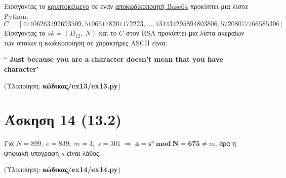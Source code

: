 \documentclass[12pt]{article}
\newcommand{\lt}{\latintext}
\begin{document}
\noindent
Εισάγοντας το \href{https://github.com/drazioti/book_crypto/blob/master/public_key_crypto/7.2}{κρυπτοκείμενο} σε έναν \href{https://www.base64decode.org/}{αποκωδικοποιητή {\lt Base64}} προκύπτει 
μια λίστα {\lt Python}:
\[
C=[47406263192693509,51065178201172223, ..., 134434295894803806,57208077766585306]
\]
Είσάγοντας το $sk = (D_{12},\:N)$ και το $C$ στον {\lt RSA} προκύπτει μια λίστα ακεραίων των 
οποίων η κωδικοποίηση σε χαρακτήρες {\lt ASCII} είναι:

{\lt
\begin{center}
	``\textbf{ Just because you are a character doesn't mean that you have character}"
\end{center}
}
\vspace{0.1in}
\noindent
(Υλοποίηση: \textbf{κώδικας/{\lt ex13/ex13.py}})

\section*{Άσκηση 14 (13.2)}

Για $N = 899,\;e = 839,\;m = 3,\; s = 301\; \Rightarrow\; \mathbf{a = s^{e}\:mod\:N = 675} \neq m$, 
άρα η ψηφιακή υπογραφή $s$ είναι λάθος.

\vspace{0.3in}
\noindent
(Υλοποίηση: \textbf{κώδικας/{\lt ex14/ex14.py}})
\end{document}
